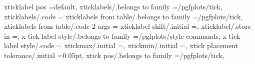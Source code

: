 {{{{{{{{{{{{{xticklabel pos                                                     =default,                                                                                                                           
xticklabels/.belongs to family                                     =/pgfplots/tick,                                                                                                                    
xticklabels/.code                                                  ={%
xticklabels from table/.belongs to family                          =/pgfplots/tick,                                                                                                                    
xticklabels from table/.code 2 args                                ={%
xticklabel shift/.initial                                          =,                                                                                                                                  
xticklabel/.store in                                               =\pgfplots@xticklabel,                                                                                                              
x tick label style/.belongs to family                              =/pgfplots/style commands,                                                                                                          
x tick label style/.code                                           ={%
xtickmax/.initial                                                  =,                                                                                                                                  
xtickmin/.initial                                                  =,                                                                                                                                  
xtick placement tolerance/.initial                                 =0.05pt,                                                                                                                            
xtick pos/.belongs to family                                       =/pgfplots/tick,                                                                                                                    
}}}}}}}}}}}}}}}}
